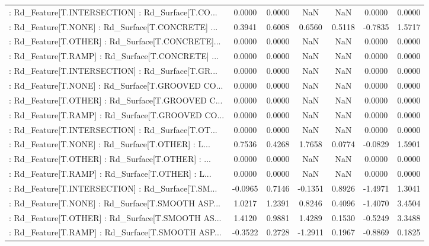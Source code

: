 \begin{longtable}{p{4cm}cccccc}
 : Rd\_Feature[T.INTERSECTION] : Rd\_Surface[T.CO... &  0.0000 &    0.0000 &     NaN &          NaN &  0.0000 &  0.0000 \\
 : Rd\_Feature[T.NONE] : Rd\_Surface[T.CONCRETE] ... &  0.3941 &    0.6008 &  0.6560 &       0.5118 & -0.7835 &  1.5717 \\
 : Rd\_Feature[T.OTHER] : Rd\_Surface[T.CONCRETE]... &  0.0000 &    0.0000 &     NaN &          NaN &  0.0000 &  0.0000 \\
 : Rd\_Feature[T.RAMP] : Rd\_Surface[T.CONCRETE] ... &  0.0000 &    0.0000 &     NaN &          NaN &  0.0000 &  0.0000 \\
 : Rd\_Feature[T.INTERSECTION] : Rd\_Surface[T.GR... &  0.0000 &    0.0000 &     NaN &          NaN &  0.0000 &  0.0000 \\
 : Rd\_Feature[T.NONE] : Rd\_Surface[T.GROOVED CO... &  0.0000 &    0.0000 &     NaN &          NaN &  0.0000 &  0.0000 \\
 : Rd\_Feature[T.OTHER] : Rd\_Surface[T.GROOVED C... &  0.0000 &    0.0000 &     NaN &          NaN &  0.0000 &  0.0000 \\
 : Rd\_Feature[T.RAMP] : Rd\_Surface[T.GROOVED CO... &  0.0000 &    0.0000 &     NaN &          NaN &  0.0000 &  0.0000 \\
 : Rd\_Feature[T.INTERSECTION] : Rd\_Surface[T.OT... &  0.0000 &    0.0000 &     NaN &          NaN &  0.0000 &  0.0000 \\
 : Rd\_Feature[T.NONE] : Rd\_Surface[T.OTHER] : L... &  0.7536 &    0.4268 &  1.7658 &       0.0774 & -0.0829 &  1.5901 \\
 : Rd\_Feature[T.OTHER] : Rd\_Surface[T.OTHER] : ... &  0.0000 &    0.0000 &     NaN &          NaN &  0.0000 &  0.0000 \\
 : Rd\_Feature[T.RAMP] : Rd\_Surface[T.OTHER] : L... &  0.0000 &    0.0000 &     NaN &          NaN &  0.0000 &  0.0000 \\
 : Rd\_Feature[T.INTERSECTION] : Rd\_Surface[T.SM... & -0.0965 &    0.7146 & -0.1351 &       0.8926 & -1.4971 &  1.3041 \\
 : Rd\_Feature[T.NONE] : Rd\_Surface[T.SMOOTH ASP... &  1.0217 &    1.2391 &  0.8246 &       0.4096 & -1.4070 &  3.4504 \\
 : Rd\_Feature[T.OTHER] : Rd\_Surface[T.SMOOTH AS... &  1.4120 &    0.9881 &  1.4289 &       0.1530 & -0.5249 &  3.3488 \\
 : Rd\_Feature[T.RAMP] : Rd\_Surface[T.SMOOTH ASP... & -0.3522 &    0.2728 & -1.2911 &       0.1967 & -0.8869 &  0.1825 \\

\end{longtable}
